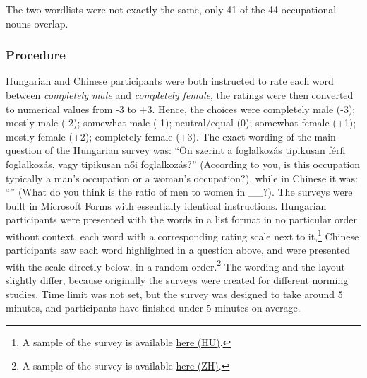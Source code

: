 \documentclass[10pt, a4paper]{article}
\newcommand{\zh}[1]{\simplifiedchinesefont{#1}\rmfamily}
\begin{document}
The two wordlists were not exactly the same, only 41 of the 44 occupational nouns overlap.

\subsubsection{Procedure}

Hungarian and Chinese participants were both instructed to rate each word between \textit{completely male} and \textit{completely female}, the ratings were then converted to numerical values from -3 to +3. Hence, the choices were completely male (-3); mostly male (-2); somewhat male (-1); neutral/equal (0); somewhat female (+1); mostly female (+2); completely female (+3). The exact wording of the main question of the Hungarian survey was: ``Ön szerint a foglalkozás tipikusan férfi foglalkozás, vagy tipikusan női foglalkozás?'' (According to you, is this occupation typically a man's occupation or a woman's occupation?), while in Chinese it was: ``\zh{对于\hspace{0pt}XX\hspace{0pt}这个职业，\hspace{0pt}您\hspace{0pt}认为\hspace{0pt}通常\hspace{0pt}担\hspace{0pt}任该\hspace{0pt}职业\hspace{0pt}的\hspace{0pt}男女\hspace{0pt}性别\hspace{0pt}比例\hspace{0pt}是\hspace{0pt}多少？}'' (What do you think is the ratio of men to women in \_\_?). The surveys were built in Microsoft Forms with essentially identical instructions. Hungarian participants were presented with the words in a list format in no particular order without context, each word with a corresponding rating scale next to it,\footnote{A sample of the survey is available \href{https://anonymous.4open.science/r/occupational-gender-bias/survey_hu.png}{here (HU)}.}
Chinese participants saw each word highlighted in a question above, and were presented with the scale directly below, in a random order.\footnote{A sample of the survey is available \href{https://anonymous.4open.science/r/occupational-gender-bias/survey_zh.png}{here (ZH)}.}
The wording and the layout slightly differ, because originally the surveys were created for different norming studies. Time limit was not set, but the survey was designed to take around 5 minutes, and participants have finished under 5 minutes on average.
\end{document}
